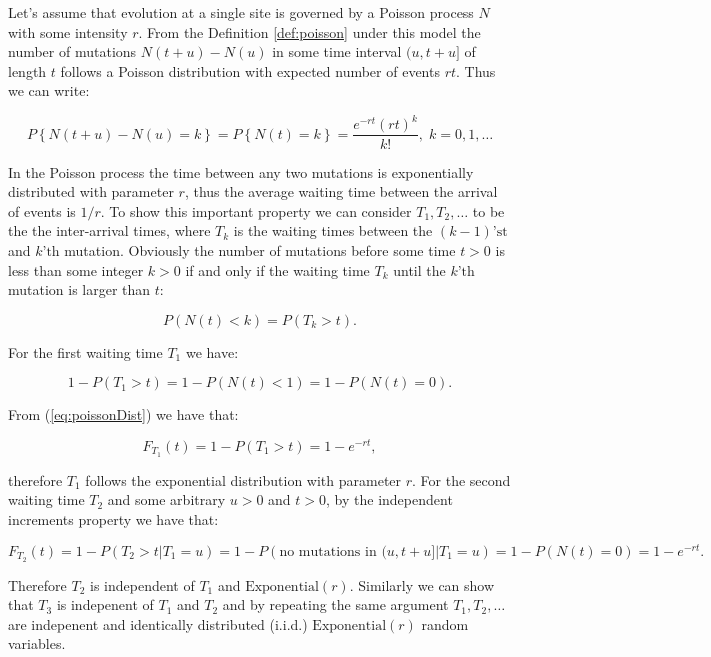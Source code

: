 \documentclass[12pt,twoside]{mitthesis}
\theoremstyle{plain}
\theoremstyle{definition}
\theoremstyle{remark}
\begin{document}
Let's assume that evolution at a single site is governed by a Poisson process $N$ with some intensity $r$.
From the Definition \ref{def:poisson} under this model the number of mutations $N(t+u)-N(u)$ in some time interval $(u,t+u]$ of length $t$ follows a Poisson distribution with expected number of events $r t$.
Thus we can write:

\begin{equation}
P\left\{ N(t+u)-N(u)=k\right\} =P\left\{ N(t)=k\right\}=\frac{e^{-r t}(r t)^{k}}{k!},\; k=0,1,\ldots
\label{eq:poissonDist} 
\end{equation}

In the Poisson process the time between any two mutations is exponentially distributed with parameter $r$, thus the average waiting time between the arrival of events is $1/r$.
To show this important property we can consider $T_1,T_2,\ldots$ to be the the inter-arrival times, where $T_k$ is the waiting times between the $(k-1)\text{'st}$ and $k\text{'th}$ mutation. 
Obviously the number of mutations before some time $t>0$ is less than some integer $k>0$ if and only if the waiting time $T_k$ until the $k\text{'th}$ mutation is larger than $t$:

\begin{equation}
P\left(N(t)<k\right)=P\left(T_{k}>t\right).
\end{equation}

\noindent
For the first waiting time $T_1$ we have:

\begin{equation}
1-P\left(T_{1}>t\right)=1-P\left(N(t)<1\right)=1-P\left(N(t)=0\right).
\end{equation}

\noindent
From (\ref{eq:poissonDist}) we have that:

\begin{equation}
F_{T_{1}}(t)=1-P\left(T_{1}>t\right)=1-e^{-r t},
\end{equation}

\noindent
therefore $T_1$ follows the exponential distribution with parameter $r$.
For the second waiting time $T_2$ and some arbitrary $u>0$ and $t>0$, by the independent increments property we have that:

\begin{equation}
F_{T_{2}}(t)=1-P\left(T_{2}>t|T_{1}=u\right)=1-P\left(\text{no mutations in }(u,t+u]|T_{1}=u\right)=1-P\left(N(t)=0\right)=1-e^{-r t}.
\end{equation}

\noindent
Therefore $T_2$ is independent of $T_1$ and $\text{Exponential}(r)$. 
Similarly we can show that $T_3$ is indepenent of $T_1$ and $T_2$ and by repeating the same argument $T_1,T_2,\ldots$ are indepenent and identically distributed (i.i.d.) $\text{Exponential}(r)$ random variables.
\end{document}

